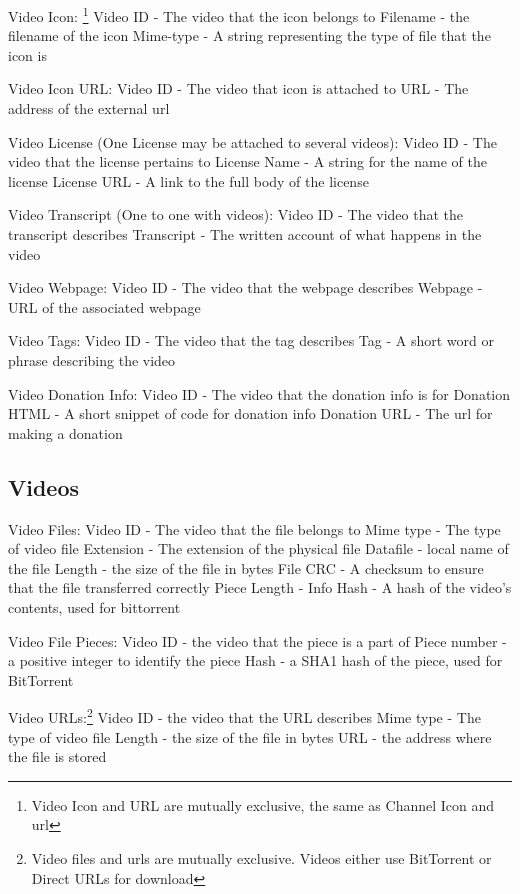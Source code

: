 \documentclass[a4paper,12pt]{report}
\begin{document}
Video Icon:
\footnote{Video Icon and URL are mutually exclusive, the same as Channel Icon and url}
    Video ID - The video that the icon belongs to
    Filename - the filename of the icon
    Mime-type - A string representing the type of file that the icon is

Video Icon URL:
    Video ID - The video that icon is attached to
    URL - The address of the external url

Video License (One License may be attached to several videos):
    Video ID - The video that the license pertains to
    License Name - A string for the name of the license
    License URL - A link to the full body of the license

Video Transcript (One to one with videos):
    Video ID - The video that the transcript describes
    Transcript - The written account of what happens in the video

Video Webpage:
    Video ID - The video that the webpage describes
    Webpage - URL of the associated webpage

Video Tags:
    Video ID - The video that the tag describes
    Tag - A short word or phrase describing the video

Video Donation Info:
    Video ID - The video that the donation info is for
    Donation HTML - A short snippet of code for donation info
    Donation URL - The url for making a donation

\subsection{Videos}
Video Files:
    Video ID - The video that the file belongs to
    Mime type - The type of video file
    Extension - The extension of the physical file
    Datafile - local name of the file
    Length - the size of the file in bytes
    File CRC - A checksum to ensure that the file transferred correctly
    Piece Length -
    Info Hash - A hash of the video's contents, used for bittorrent

Video File Pieces:
    Video ID - the video that the piece is a part of
    Piece number - a positive integer to identify the piece
    Hash - a SHA1 hash of the piece, used for BitTorrent

Video URLs:\footnote{Video files and urls are mutually exclusive. Videos either use BitTorrent or Direct URLs for download}
    Video ID - the video that the URL describes
    Mime type - The type of video file
    Length - the size of the file in bytes
    URL - the address where the file is stored
\end{document}
